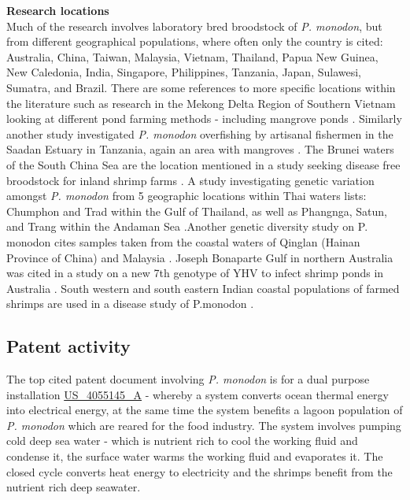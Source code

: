 \documentclass[]{book}
\theoremstyle{definition}
\theoremstyle{definition}
\theoremstyle{definition}
\theoremstyle{remark}
\begin{document}
\textbf{Research locations}\\
Much of the research involves laboratory bred broodstock of \emph{P.
monodon}, but from different geographical populations, where often only
the country is cited: Australia, China, Taiwan, Malaysia, Vietnam,
Thailand, Papua New Guinea, New Caledonia, India, Singapore,
Philippines, Tanzania, Japan, Sulawesi, Sumatra, and Brazil. There are
some references to more specific locations within the literature such as
research in the Mekong Delta Region of Southern Vietnam looking at
different pond farming methods - including mangrove ponds
\citep{Ha_2013}. Similarly another study investigated \emph{P. monodon}
overfishing by artisanal fishermen in the Saadan Estuary in Tanzania,
again an area with mangroves \citep{Mosha_2013}. The Brunei waters of
the South China Sea are the location mentioned in a study seeking
disease free broodstock for inland shrimp farms \citep{Claydon_2010}. A
study investigating genetic variation amongst \emph{P. monodon} from 5
geographic locations within Thai waters lists: Chumphon and Trad within
the Gulf of Thailand, as well as Phangnga, Satun, and Trang within the
Andaman Sea \citep{Supungul_2000}.Another genetic diversity study on P.
monodon cites samples taken from the coastal waters of Qinglan (Hainan
Province of China) and Malaysia \citep{Wang_2008}. Joseph Bonaparte Gulf
in northern Australia was cited in a study on a new 7th genotype of YHV
to infect shrimp ponds in Australia \citep{Mohr_2015}. South western and
south eastern Indian coastal populations of farmed shrimps are used in a
disease study of P.monodon \citep{Mohr_2015}.

\hypertarget{patent-activity-6}{%
\subsection{Patent activity}\label{patent-activity-6}}

The top cited patent document involving \emph{P. monodon} is for a dual
purpose installation
\href{https://www.lens.org/lens/patent/US_4055145_A}{US\_4055145\_A} -
whereby a system converts ocean thermal energy into electrical energy,
at the same time the system benefits a lagoon population of \emph{P.
monodon} which are reared for the food industry. The system involves
pumping cold deep sea water - which is nutrient rich to cool the working
fluid and condense it, the surface water warms the working fluid and
evaporates it. The closed cycle converts heat energy to electricity and
the shrimps benefit from the nutrient rich deep seawater.
\end{document}
